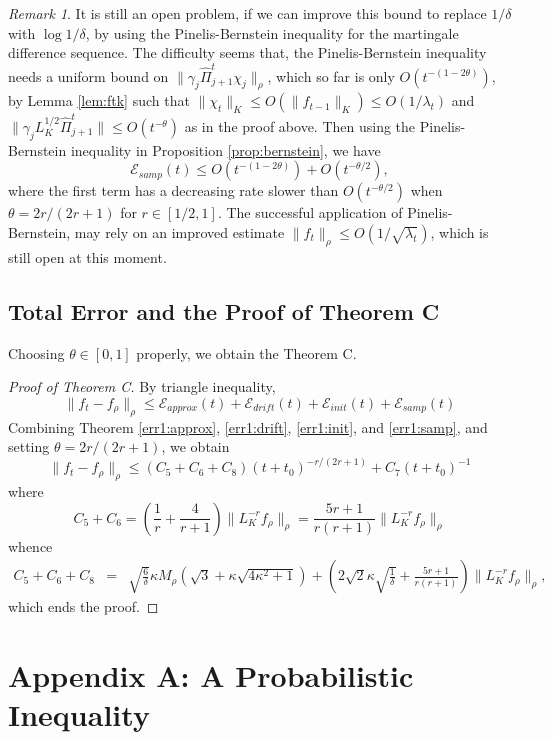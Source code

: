 \documentclass[twoside,11pt]{amsart}
\theoremstyle{theorem}
\theoremstyle{definition}
\theoremstyle{remark}
\newtheorem{rem}[thm]{Remark}
\def\M{M_\rho}
\def\PPi{{\hat{\Pi}}}
\def\Err{{\mathscr E}}
\def\t{t_0}
\def\la{\lambda}
\def\de{\delta}
\def\ka{\kappa}
\def\ga{\gamma}
\begin{document}
\begin{rem} \label{rem:open}
It is still an open problem, if we can improve this bound to replace $1/\de$ with $\log 1/\de$, 
by using the Pinelis-Bernstein inequality for the martingale difference sequence. 
The difficulty seems that, the Pinelis-Bernstein inequality needs a uniform bound on $\|\gamma_j \PPi_{j+1}^t \chi_j\|_\rho$,
which so far is only $O(t^{-(1-2\theta)})$, by Lemma \ref{lem:ftk} such that $\|\chi_t\|_K \leq O(\|f_{t-1}\|_K) \leq O(1/\la_t)$ 
and $\|\ga_j L_K^{1/2} \PPi_{j+1}^t\|\leq O(t^{-\theta})$ as in the proof above. 
Then using the Pinelis-Bernstein inequality in Proposition \ref{prop:bernstein}, we have
\[ \Err_{samp}(t) \leq O(t^{-(1-2\theta)}) + O(t^{-\theta/2}), \]
where the first term has a decreasing rate slower than $O(t^{-\theta/2})$ when $\theta=2r/(2r+1)$ for $r\in [1/2,1]$. 
The successful application of Pinelis-Bernstein, may rely on an improved estimate $\|f_t\|_\rho \leq O(1/\sqrt{\la_t})$, 
which is still open at this moment.  
\end{rem}

\subsection{Total Error and the Proof of Theorem C}


Choosing $\theta\in [0,1]$ properly, we obtain the Theorem C. 

\begin{proof}[Proof of Theorem C] By triangle inequality,
\[ \|f_t - f_\rho \|_\rho \leq \Err_{approx}(t) + \Err_{drift}(t) + \Err_{init}(t) + \Err_{samp}(t)  \]
Combining Theorem \ref{err1:approx}, \ref{err1:drift}, \ref{err1:init}, and \ref{err1:samp}, and setting $\theta = 2r/(2r+1)$, we obtain
\[ \|f_t - f_\rho\|_\rho \leq (C_5 + C_6 +C_8) (t+\t)^{-r/(2r+1)} + C_7 (t+\t)^{-1} \]
where
\[ C_5+ C_6 = \left(\frac{1}{r} + \frac{4}{r+1}\right)\|L_K^{-r} f_\rho\|_\rho = \frac{5r+1}{r(r+1)}\|L_K^{-r} f_\rho\|_\rho \]
whence 
\begin{eqnarray*} 
C_5+C_6+C_8 & = & \sqrt{\frac{6}{\delta}} \ka \M (\sqrt{3}  + \ka \sqrt{4\ka^2+1} )+ \left(2\sqrt{2}\ka\sqrt{\frac{1}{\delta}}+\frac{5r+1}{r(r+1)}\right)\|L_K^{-r} f_\rho \|_\rho,
\end{eqnarray*}
which ends the proof.
\end{proof}


\section*{Appendix A: A Probabilistic Inequality}
\renewcommand{\thesection}{A}
\setcounter{equation}{0} \setcounter{thm}{0}
\renewcommand{\thethm}{A.\arabic{thm}}
\renewcommand{\theequation}{A-\arabic{equation}}
\end{document}
